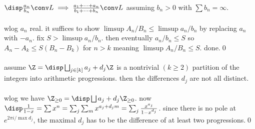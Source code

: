  $\disp \frac{a_n}{b_n}\conv L\implies 
\frac{a_1+\dots+a_n}{b_1+\dots+b_n}\conv L$ assuming $b_n>0$ with 
$\sum b_n=\infty$.\\\\
\proof wlog $a_n$ real. it suffices to show $\limsup A_n/B_n\le\limsup a_n/b_n$ by replacing $a_n$ with $-a_n$. fix $S>\limsup a_n/b_n$. 
then eventually $a_n/b_n\le S$ so $A_n-A_k\le S(B_n-B_k)$ for $n>k$ meaning $\limsup A_n/B_n\le S$. done.\qed\\\\
 assume $\Z=\disp\bigsqcup_{j\in[k]} a_j+d_j\Z$ is a nontrivial $(k\ge2)$ 
partition of the integers into arithmetic progressions. then the differences $d_j$ are not all distinct.\\\\
\proof wlog we have $\Z_{\ge0}=\disp\bigsqcup a_j+d_j\Z_{\ge0}$. now 
$\disp\frac{1}{1-x}=\sum x^n=\sum_j\sum_m x^{a_j+d_jm}=\sum_j \frac{x^{a_j}}{1-x^{d_j}}$. 
since there is no pole at $e^{2\pi i/\max{d_j}}$, the maximal $d_j$ has to be the difference of at least two progressions.\qed\\\\
